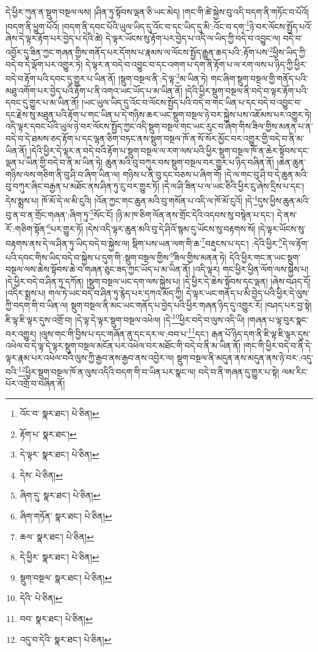 དེ་ཕྱིར་ཀུན་ན་སྡུག་བསྔལ་ལས། །ཤིན་ཏུ་སྟོབས་ལྡན་ཅི་ཡང་མེད། །གང་གི་ཚེ་སྐྱེས་བུ་འདི་བདག་ནི་གཏོང་བ་པོའོ། །བདག་ནི་ཕྱུག་པོའོ། །བདག་ནི་དབང་པོའི་ཡུལ་ཡིད་དུ་འོང་བ་དང་ཡིད་དུ་མི་:འོང་བ་དག་\footnote{འོང་བ་  སྣར་ཐང་།  པེ་ཅིན། }ཉེ་བར་ལོངས་སྤྱོད་པའོ་ཞེས་དེ་ལྟར་རྟོག་པར་བྱེད་པ་དེའི་ཚེ། དེ་ལྟར་ཡོངས་སུ་རྟོག་པར་བྱེད་པ་འདི་ལ་ཡིད་ཀྱི་བདེ་བ་འབྱུང་ལ། བདེ་བ་འབྱོར་དུ་ཟིན་ཀྱང་གཞན་གྱིས་གནོད་པར་དོགས་པ་རྣམས་ལ་ལོངས་སྤྱོད་རྒྱུན་ཆད་པའི་:རྟོག་པས་\footnote{རྟོག་པ་  སྣར་ཐང་། }ཕྱིས་ཡིད་ཀྱི་བདེ་བ་དེ་ལྡོག་པར་འགྱུར་ཏེ། དེ་ལྟར་ན་བདེ་བ་འབྱུང་བ་དང་འགག་པ་དག་ནི་རྟོག་པ་ལ་རག་ལས་པ་ཉིད་ཀྱི་ཕྱིར་བདེ་བ་རྟོག་པའི་དབང་དུ་གྱུར་པ་ཡིན་ནོ། །སྡུག་བསྔལ་ནི་:དེ་ལྟ་\footnote{དེ་ལྟར་  སྣར་ཐང་།  པེ་ཅིན། }མ་ཡིན་ཏེ། གང་ཞིག་སྡུག་བསྔལ་གྱི་གནོད་པའི་མཐུ་འགོག་པར་བྱེད་པའི་རྟོག་པ་ནི་འགའ་ཡང་ཡོད་པ་མ་ཡིན་ནོ། །དེའི་ཕྱིར་སྡུག་བསྔལ་ནི་བདེ་བ་ལྟར་རྟོག་པའི་དབང་དུ་གྱུར་པ་མ་ཡིན་ནོ། །ཡང་ཡུལ་ཡིད་དུ་འོང་བ་ལོངས་སྤྱོད་པའི་བདེ་བ་གང་ཡིན་པ་དང་བདེ་བ་འབྱུང་བ་དང་རྗེས་སུ་མཐུན་པའི་རྟོག་པ་གང་ཡིན་པ་དེ་གཉིས་ཆར་ཡང་སྡུག་བསྔལ་ཉེ་བར་སྐྱེས་པས་འཇོམས་པར་འགྱུར་ཏེ། འདི་ལྟར་དབང་པོའི་ཡུལ་ཉེ་བར་ལོངས་སྤྱོད་ཀྱང་འདི་སྡུག་བསྔལ་གང་ཡང་རུང་བ་ཞིག་གིས་ཟིལ་གྱིས་མནན་པ་ན་བདེ་བ་དེ་ཐམས་ཅད་རྟོག་པ་དང་ལྷན་ཅིག་བཏང་ནས་སྡུག་བསྔལ་ཁོ་ན་སོ་སོར་མྱོང་བར་འགྱུར་གྱི་བདེ་བ་ནི་མ་ཡིན་ནོ། །དེའི་ཕྱིར་དེ་ལྟར་ན་བདེ་བའི་རྟོག་པ་སྡུག་བསྔལ་ལ་རག་ལས་པའི་ཕྱིར་སྡུག་བསྔལ་ཁོ་ན་ཆེར་སྟོབས་དང་ལྡན་པ་ཡིན་གྱི་བདེ་བ་ནི་མ་ཡིན་ཏེ། ཆུན་མའི་བུ་བཀུར་བས་སྡུག་བསྔལ་བར་གྱུར་པ་ཉིད་བཞིན་ནོ། །ཆེན་ཆུན་གཉིས་ལས་གཅིག་ནི་བུ་ཤི་བ་ཞིག་ཡིན་ལ། གཉིས་པ་ནི་བུ་དང་བཅས་པ་ཞིག་གོ། །དེ་ལ་གང་བུ་ཤི་བ་དེ་ཆུན་མའི་བུ་བཀུར་ཞིང་བརྒྱན་པ་མཐོང་ནས་ཤིན་ཏུ་ངུ་བར་གྱུར་ཏོ། །དེ་ལ་ཤི་ཟིན་པ་ལ་ཡང་ཅིའི་ཕྱིར་ངུ་ཞེས་དྲིས་པ་དང་། དེས་སྨྲས་པ། ཁོ་མོ་དེ་ལ་མི་ངུའི། །འོན་ཀྱང་གང་ཆུན་མའི་བུ་གསོན་པ་འདི་ལ་ཁོ་མོ་ངུའོ། །དེ་\footnote{དེས་  པེ་ཅིན། }དུས་ཕྱིས་ཆུན་མའི་བུ་ན་བ་ན་གྲོང་གཞན་:ཞིག་ཏུ་\footnote{ཞིག་དུ་  སྣར་ཐང་།  པེ་ཅིན། }སོང་ངོ། །ཉི་མ་ཁ་ཅིག་ལོན་ནས་གྲོང་དེའི་འདབས་སུ་བསྙེན་པ་དང་། དེ་ནས་རོ་:གཅིག་སྟོན་\footnote{ཞིག་གཏོན་  སྣར་ཐང་།  པེ་ཅིན། }པར་གྱུར་ཏོ། །དེས་འདི་ལྟར་ཆུན་མའི་བུ་དེ་ཤིའོ་སྙམ་དུ་ཡོངས་སུ་བརྟགས་སོ། །དེ་ལྟར་ཡོངས་སུ་བརྟགས་ནས་དེ་ལ་ཤིན་ཏུ་ཡིད་བདེ་བ་སྐྱེས་ལ། སྡིག་པས་ཡན་ལག་གི་ཆ་\footnote{ཆལ་  སྣར་ཐང་།  པེ་ཅིན། }བརྡུངས་པ་དང་། :དེའི་ཕྱིར་\footnote{དེ་ཕྱིར་  སྣར་ཐང་།  པེ་ཅིན། }དེ་ལ་རྟོག་པའི་དབང་གིས་ཡིད་བདེ་བ་སྐྱེས་པ་དུག་གི་:སྡུག་བསྔལ་གྱིས་\footnote{སྡུག་བསྔལ་  སྣར་ཐང་།  པེ་ཅིན། }ཟིལ་གྱིས་མནན་ཏེ། དེའི་ཕྱིར་གང་ན་ཡང་སྡུག་བསྔལ་ལས་ཆེས་སྟོབས་ཆེ་བ་གཞན་ཅུང་ཟད་ཀྱང་ཡོད་པ་མ་ཡིན་ནོ། །འདི་ལྟར། གང་ཕྱིར་ཕྱིན་ལོག་ལས་སྐྱེས་པ། །དེ་ཕྱིར་བདེ་བ་ཤིན་ཏུ་དཀོན། །སྡུག་བསྔལ་ཡང་དག་ལས་སྐྱེས་པ། །དེ་ཕྱིར་དེ་ཆེས་སྟོབས་དང་ལྡན། །ཞེས་བཤད་དོ། །འདིར་སྨྲས་པ། གལ་ཏེ་ཡང་བདེ་བ་ཤིན་ཏུ་རྙེད་པར་དཀའ་མོད་ཀྱི། དེ་ལྟར་ཡང་གནོད་པ་མི་བྱེད་པའི་ཕྱིར་དེ་ལུས་ཀྱི་བདག་གི་བ་ཡིན་ལ། སྡུག་བསྔལ་ནི་མང་ཡང་གནོད་པ་བྱེད་པའི་ཕྱིར་གཞན་ཉིད་དུ་འགྱུར་རོ། །བཤད་པར་བྱ་སྟེ། ཇི་ལྟ་ཇི་ལྟར་དུས་འགྲོ་བ། །དེ་ལྟ་དེ་ལྟར་སྡུག་བསྔལ་འཕེལ། །དེ་\footnote{དེའི་  པེ་ཅིན། }ཕྱིར་བདེ་བ་ལུས་འདི་ཡི། །གཞན་པ་ལྟ་བུར་སྣང་བར་འགྱུར། །ལུས་གང་གི་བྱིས་པ་དང་གཞོན་ནུ་དང་དར་ལ་:བབ་པ་\footnote{བབ་  སྣར་ཐང་།  པེ་ཅིན། }དང་། རྒན་པོ་ཉིད་དག་ནི་ཇི་ལྟ་ཇི་ལྟར་དུས་འཕེལ་བ་དེ་ལྟ་དེ་ལྟར་སྡུག་བསྔལ་མངོན་པར་འཕེལ་བར་མཐོང་གི་བདེ་བ་ནི་མ་ཡིན་ནོ། །གང་གི་ཕྱིར་བདེ་བ་ནི་དེ་ལྟར་རྣམ་པར་འཕེལ་བའི་ལུས་ཀྱི་རྒྱབ་ནས་རྒྱབ་ནས་འབྱེར་ལ། སྡུག་བསྔལ་ནི་མདུན་ནས་མདུན་ནས་ཉེ་བར་:འདུ་བའི་\footnote{འདུ་བ་དེའི་  སྣར་ཐང་།  པེ་ཅིན། }ཕྱིར་སྡུག་བསྔལ་ཁོ་ན་ལུས་འདིའི་བདག་གི་བ་ཡིན་པར་སྣང་ལ། བདེ་བ་ནི་གཞན་དུ་གྱུར་པ་སྟེ། ལམ་རིང་པོར་འགྲོ་བ་བཞིན་ནོ། 